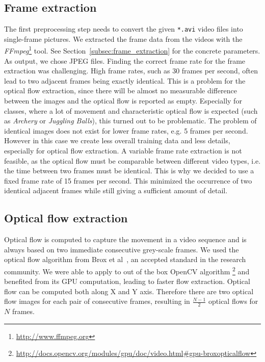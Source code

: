 \subsection{Frame extraction}
The first preprocessing step needs to convert the given \texttt{*.avi} video files into single-frame pictures.
We extracted the frame data from the videos with the \emph{FFmpeg}\footnote{\url{http://www.ffmpeg.org}} tool.
See Section~\ref{subsec:frame_extraction} for the concrete parameters.
As output, we chose JPEG files.
Finding the correct frame rate for the frame extraction was challenging.
High frame rates, such as 30 frames per second, often lead to two adjacent frames being exactly identical.
This is a problem for the optical flow extraction, since there will be almost no measurable difference between the images and the optical flow is reported as empty.
Especially for classes, where a lot of movement and characteristic optical flow is expected (such as \emph{Archery} or \emph{Juggling Balls}), this turned out to be problematic.
The problem of identical images does not exist for lower frame rates, e.g. 5 frames per second.
However in this case we create less overall training data and less details, especially for optical flow extraction.
A variable frame rate extraction is not feasible, as the optical flow must be comparable between different video types, i.e. the time between two frames must be identical.
This is why we decided to use a fixed frame rate of 15 frames per second.
This minimized the occurrence of two identical adjacent frames while still giving a sufficient amount of detail.

\subsection{Optical flow extraction}
Optical flow is computed to capture the movement in a video sequence and is always based on two immediate consecutive grey-scale frames.
We used the optical flow algorithm from Brox et al~\cite{brox2004high}, an accepted standard in the research community.
We were able to apply to out of the box OpenCV algorithm \footnote{\url{http://docs.opencv.org/modules/gpu/doc/video.html\#gpu-broxopticalflow}} and benefited from its GPU computation, leading to faster flow extraction.
Optical flow can be computed both along X and Y axis. Therefore there are two optical flow images for each pair of consecutive frames, resulting in $\frac{N - 1}{2}$ optical flows for $N$ frames.

